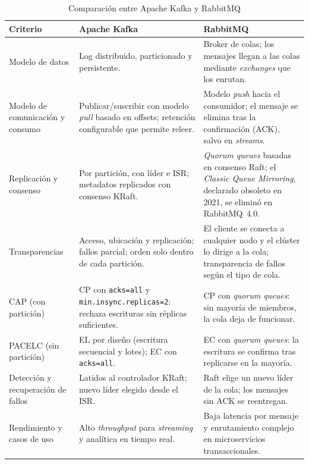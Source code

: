 \documentclass[12pt,a4paper]{article}
\begin{document}
\begin{table}[H]
  \centering
  \small
  \caption{Comparación entre Apache Kafka y RabbitMQ}
  \label{tab:comparacion}
  \renewcommand{\arraystretch}{1.25}
  \begin{tabularx}{\textwidth}{@{}>{\raggedright\arraybackslash}p{3.1cm}>{\raggedright\arraybackslash}X>{\raggedright\arraybackslash}X@{}}
    \toprule
    \textbf{Criterio} & \textbf{Apache Kafka} & \textbf{RabbitMQ} \\
    \midrule
    Modelo de datos & Log distribuido, particionado y persistente. & Broker de colas; los mensajes llegan a las colas mediante \textit{exchanges} que los enrutan. \\
    Modelo de comunicación y consumo & Publicar/suscribir con modelo \textit{pull} basado en offsets; retención configurable que permite releer. & Modelo \textit{push} hacia el consumidor; el mensaje se elimina tras la confirmación (ACK), salvo en \textit{streams}. \\
    Replicación y consenso & Por partición, con líder e ISR; metadatos replicados con consenso KRaft. & \textit{Quorum queues} basadas en consenso Raft; el \textit{Classic Queue Mirroring}, declarado obsoleto en 2021, se eliminó en RabbitMQ~4.0. \\
    Transparencias & Acceso, ubicación y replicación; fallos parcial; orden solo dentro de cada partición. & El cliente se conecta a cualquier nodo y el clúster lo dirige a la cola; transparencia de fallos según el tipo de cola. \\
    CAP (con partición) & CP con \texttt{acks=all} y \texttt{min.insync.replicas=2}: rechaza escrituras sin réplicas suficientes. & CP con \textit{quorum queues}: sin mayoría de miembros, la cola deja de funcionar. \\
    PACELC (sin partición) & EL por diseño (escritura secuencial y lotes); EC con \texttt{acks=all}. & EC con \textit{quorum queues}: la escritura se confirma tras replicarse en la mayoría. \\
    Detección y recuperación de fallos & Latidos al controlador KRaft; nuevo líder elegido desde el ISR. & Raft elige un nuevo líder de la cola; los mensajes sin ACK se reentregan. \\
    Rendimiento y casos de uso & Alto \textit{throughput} para \textit{streaming} y analítica en tiempo real. & Baja latencia por mensaje y enrutamiento complejo en microservicios transaccionales. \\
    \bottomrule
  \end{tabularx}
\end{table}
\end{document}
